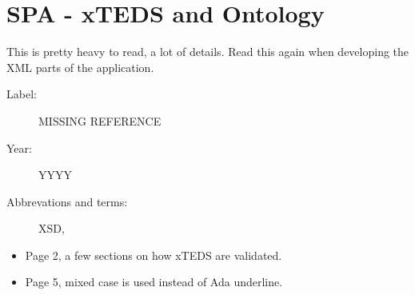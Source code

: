 \section{SPA - xTEDS and Ontology}

This is pretty heavy to read, a lot of details. Read this again when developing
the XML parts of the application.

\begin{description}
    \item[Label:] MISSING REFERENCE %
    \item[Year:] YYYY
    \item[Abbrevations and terms:]
        XSD,
\end{description}

\begin{itemize}
    \item Page 2, a few sections on how xTEDS are validated.
    \item Page 5, mixed case is used instead of Ada underline.
\end{itemize}

%
%
%
%
